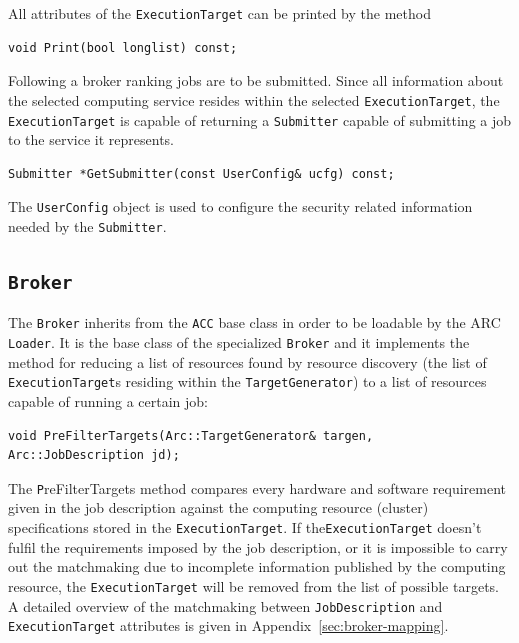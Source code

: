 \documentclass{book}
\newcommand{\ACC}{\texttt{ACC}}
\newcommand{\Broker}{\texttt{Broker}}
\newcommand{\ExecutionTarget}{\texttt{ExecutionTarget}}
\newcommand{\JobDescription}{\texttt{JobDescription}}
\newcommand{\TargetGenerator}{\texttt{TargetGenerator}}
\newcommand{\Submitter}{\texttt{Submitter}}
\newcommand{\UserConfig}{\texttt{UserConfig}}
\begin{document}
All attributes of the {\ExecutionTarget} can be printed by the method

\begin{shaded}
\begin{verbatim}
void Print(bool longlist) const;
\end{verbatim}
\end{shaded}

Following a broker ranking jobs are to be submitted. Since all
information about the selected computing service resides within the
selected {\ExecutionTarget}, the {\ExecutionTarget} is capable of
returning a {\Submitter} capable of submitting a job to the service it
represents.

\begin{shaded}
\begin{verbatim}
Submitter *GetSubmitter(const UserConfig& ucfg) const;
\end{verbatim}
\end{shaded}

The {\UserConfig} object is used to configure the security related
information needed by the {\Submitter}.

\subsection{{\Broker}}

The {\Broker} inherits from the {\ACC} base class in order to be loadable by the ARC \texttt{Loader}. It is the base class of the 
specialized {\Broker} and it implements the method for reducing a list of resources found by resource discovery (the list of 
{\ExecutionTarget}s residing within the {\TargetGenerator}) to a list of resources capable of running a certain job:

\begin{shaded}
\begin{verbatim}
void PreFilterTargets(Arc::TargetGenerator& targen, Arc::JobDescription jd);
\end{verbatim}
\end{shaded}

The {\texttt PreFilterTargets} method compares every hardware and software requirement given in the job description against the 
computing resource (cluster) specifications stored in the {\ExecutionTarget}. If the{\ExecutionTarget} doesn't fulfil 
the requirements imposed by the job description, or it is impossible to carry out the matchmaking due to incomplete information 
published by the computing resource, the {\ExecutionTarget} will be removed from the list of possible targets. A detailed overview 
of the matchmaking between {\JobDescription} and {\ExecutionTarget} attributes is given in Appendix~\ref{sec:broker-mapping}. 
 
\end{document}
